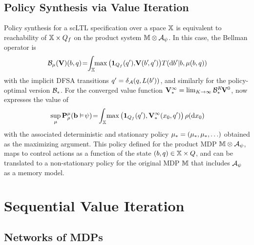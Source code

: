 \documentclass[conference]{IEEEtran}
\newcommand{\red}[1]{{\color{red} #1 }}
\begin{document}
\subsection{Policy Synthesis via Value Iteration}

Policy synthesis for a scLTL specification over a space $\mathbb{X}$ is equivalent to reachability of $\mathbb{X}\times Q_f$ on the product system $\mathbb{M} \otimes \mathcal{A}_\psi$. In this case, the Bellman operator is
\begin{equation}
\label{eq:V_recopt_inf_mu}
  \bellman_\pol (\mathbf V)(b,q)\! = \hspace{-1mm} \int_{\X} \hspace{-1mm} \max \left( \mathbf 1_{Q_f}(q'), \!\mathbf V( b'\!, q') \right)\! {\tr}(\mathrm{d} b' |b,\pol(b,q))\!
\end{equation}
with the implicit DFSA transitions  $q' =\delta_{\mathcal{A}}(q,L(b'))$, %
and similarly for the policy-optimal version $\mathcal{B}_*$.  For the converged value function $\mathbf V^\infty_* =  \lim_{K\rightarrow\infty}\mathcal{B}_*^K\! \mathbf V^0$, now expresses the value of
\begin{equation}
\label{eq:prob:_optimal} 
 \sup_{\pol}\mathbf{P}_\init^{\pol}( {\mathbf{b}} \vDash\! \psi)\! =\!
  \int_{\X} \! \max \left( \mathbf 1_{Q_f}( q'), 
   \mathbf V^\infty_*(x_0, q') \right) \init(\mathrm{d} x_0) \!
\end{equation}
with the associated deterministic and stationary policy $ \mu_*=(\mu_*,\mu_*,\ldots)$ obtained as the maximizing argument. 
This policy defined for the product MDP $\mathbb{M} \otimes \mathcal{A}_\psi$, maps to control actions as a function of the state $(b,q) \in \mathbb{X} \times Q$, and can be translated to a non-stationary policy for the original MDP $\mathbb{M}$ that includes $\mathcal{A}_\psi$ as a memory model.


\section{Sequential Value Iteration}
\label{sec:sequential_val_iter}


\subsection{Networks of MDPs}
\end{document}
